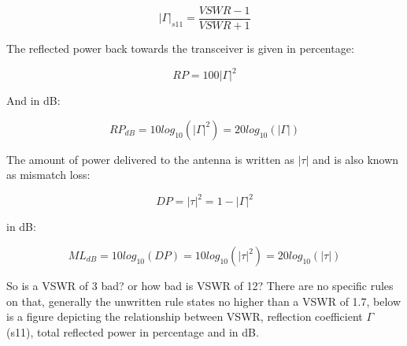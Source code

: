 \begin{equation}
   |\Gamma|_{s11}= \frac{VSWR-1}{VSWR+1}
\end{equation}

The reflected power back towards the transceiver is given in percentage:

\begin{equation}
   RP = 100|\Gamma|^2
\end{equation}

And in dB:

\begin{equation}
   RP_{dB} = 10log_{10}(|\Gamma|^2) = 20log_{10}(|\Gamma|)
\end{equation}

The amount of power delivered to the antenna is written as $|\tau|$ and is also known as mismatch loss:

\begin{equation}
   DP = |\tau|^2 = 1-|\Gamma|^2
\end{equation}

in dB:

\begin{equation}
   ML_{dB} = 10log_{10}(DP) = 10log_{10}(|\tau|^2) = 20log_{10}(|\tau|)
\end{equation}

So is a VSWR of 3 bad? or how bad is VSWR of 12? There are no specific rules on that, generally the unwritten rule states no higher than a VSWR of 1.7, below is a figure depicting the relationship between VSWR, reflection coefficient $\Gamma$ (s11), total reflected power in percentage and in dB.

